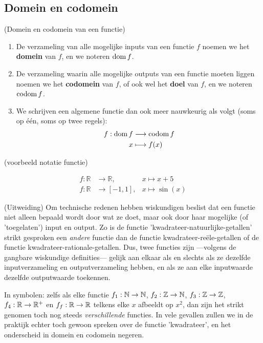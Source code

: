 \documentclass{ximera}
\begin{document}
\subsection{Domein en codomein}

 \begin{definition} (Domein en codomein van een functie)
    
    \begin{enumerate}
        \item De verzameling van alle mogelijke inputs van een functie $f$ noemen we het \textbf{domein} van $f$, en we noteren $\mathrm{dom}\, f$.
        \item De verzameling waarin alle mogelijke outputs van een functie moeten liggen noemen we het \textbf{codomein} van $f$, of ook wel het \textbf{doel} van $f$, en we noteren $\mathrm{codom}\, f$.
        \item We schrijven een algemene functie dan ook meer nauwkeurig als volgt (soms op één, soms op twee regels):
        \begin{align*}
        f: \mathrm{dom}\, f &\longrightarrow \mathrm{codom}\, f \\
        x &\longmapsto f(x)
        \end{align*}

    \end{enumerate}
\end{definition}

\begin{example} (voorbeeld notatie functie)
    
\begin{align*}
f: \mathbb{R} &\longrightarrow \mathbb{R},         & x \longmapsto x+5  \\
f: \mathbb{R} &\longrightarrow \left[-1,1\right],  & x \longmapsto \sin(x) 
\end{align*}
\end{example}

\begin{uitweiding}
    
(Uitweiding) Om technische redenen hebben wiskundigen beslist dat een functie niet alleen bepaald wordt door wat ze doet, maar ook door haar mogelijke (of 'toegelaten') input en output. Zo is de functie 'kwadrateer-natuurlijke-getallen' strikt gesproken een \textit{andere} functie dan de functie kwadrateer-reële-getallen of de functie kwadrateer-rationale-getallen. Dus, twee functies zijn ---volgens de gangbare wiskundige definities--- gelijk aan elkaar als en slechts als ze dezelfde inputverzameling en outputverzameling hebben, en als ze aan elke inputwaarde dezelfde outputwaarde toekennen.

In symbolen: zelfs als elke functie
$f_1:\mathbb{N}\to\mathbb{N}$, $f_2:\mathbb{Z} \to\mathbb{N}$, $f_3:\mathbb{Z}\to\mathbb{Z}$, $f_4:\mathbb{R}\to\mathbb{R}^+$ en $f_f:\mathbb{R}\to\mathbb{R}$ telkens elke $x$ afbeeldt op $x^2$, dan zijn het strikt genomen toch nog steeds \textit{verschillende} functies. In vele gevallen zullen we in de praktijk echter toch gewoon spreken over de functie 'kwadrateer', en het onderscheid in domein en codomein negeren.

\end{uitweiding}
\end{document}
